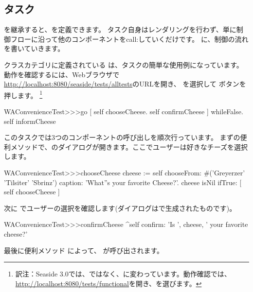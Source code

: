 \documentclass[a4paper,10pt,twoside]{book}
\begin{document}
\subsection{タスク}

を継承すると、を定義できます。
タスク自身はレンダリングを行わず、単に制御フローに沿って他のコンポーネントをcall:していくだけです。 に、制御の流れを書いていきます。

クラスカテゴリに定義されている は、タスクの簡単な使用例になっています。
動作を確認するには、Webブラウザで \url{http://localhost:8080/seaside/tests/alltests}のURLを開き、  を選択して ボタンを押します。
\footnote{訳注：Seaside 3.0では、ではなく、に変わっています。動作確認では、\url{http://localhost:8080/tests/functional}を開き、を選びます。}

\begin{code}{}
WAConvenienceTest>>>go
	[ self chooseCheese.
	  self confirmCheese ] whileFalse.
	self informCheese
\end{code}

このタスクでは3つのコンポーネントの呼び出しを順次行っています。
まずの便利メソッドで、のダイアログが開きます。ここでユーザーは好きなチーズを選択します。

\begin{code}{}
WAConvenienceTest>>>chooseCheese
	cheese := self
		chooseFrom: #('Greyerzer' 'Tilsiter' 'Sbrinz')
		caption: 'What''s your favorite Cheese?'.
	cheese isNil ifTrue: [ self chooseCheese ]
\end{code}


次に  でユーザーの選択を確認します(ダイアログはで生成されたものです)。

\begin{code}{}
WAConvenienceTest>>>confirmCheese
	^self confirm: 'Is ', cheese,  ' your favorite cheese?'
\end{code}

最後に便利メソッド によって、 が呼び出されます。
\end{document}
